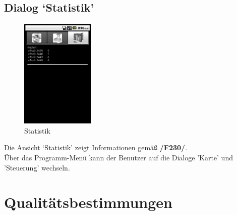 \documentclass[10pt,a4paper]{article}
\let\oldsection\section
\renewcommand{\section}{\newpage \oldsection}
\begin{document}
			\subsection{Dialog `Statistik'}
				\begin{figure}[h]
					  \centering
					\includegraphics[width=3.5cm]{screenshots/android3.png}
  					\caption{Statistik}
  				\end{figure}		
  				
  			Die Ansicht `Statistik' zeigt Informationen gemäß \textbf{/F230/}. \\
  			
  			Über das Programm-Menü kann der Benutzer auf die Dialoge 'Karte' und 'Steuerung' wechseln.
			
	\section{Qualitätsbestimmungen}
		
\end{document}
